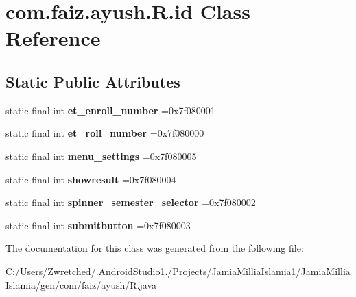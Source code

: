\hypertarget{classcom_1_1faiz_1_1ayush_1_1_r_1_1id}{}\section{com.\+faiz.\+ayush.\+R.\+id Class Reference}
\label{classcom_1_1faiz_1_1ayush_1_1_r_1_1id}
\subsection*{Static Public Attributes}
\begin{DoxyCompactItemize}
\item 
\hypertarget{classcom_1_1faiz_1_1ayush_1_1_r_1_1id_a3d6dbcf6f993a3baf3fa2a7e6fdab76b}{}static final int {\bfseries et\+\_\+enroll\+\_\+number} =0x7f080001\label{classcom_1_1faiz_1_1ayush_1_1_r_1_1id_a3d6dbcf6f993a3baf3fa2a7e6fdab76b}

\item 
\hypertarget{classcom_1_1faiz_1_1ayush_1_1_r_1_1id_a00f9cc366dc6da555ff6f483c35a7c0a}{}static final int {\bfseries et\+\_\+roll\+\_\+number} =0x7f080000\label{classcom_1_1faiz_1_1ayush_1_1_r_1_1id_a00f9cc366dc6da555ff6f483c35a7c0a}

\item 
\hypertarget{classcom_1_1faiz_1_1ayush_1_1_r_1_1id_a9604692f0d9b57136b6b43924a11715f}{}static final int {\bfseries menu\+\_\+settings} =0x7f080005\label{classcom_1_1faiz_1_1ayush_1_1_r_1_1id_a9604692f0d9b57136b6b43924a11715f}

\item 
\hypertarget{classcom_1_1faiz_1_1ayush_1_1_r_1_1id_a9eee6afec593791e6411cbcc1135db0c}{}static final int {\bfseries showresult} =0x7f080004\label{classcom_1_1faiz_1_1ayush_1_1_r_1_1id_a9eee6afec593791e6411cbcc1135db0c}

\item 
\hypertarget{classcom_1_1faiz_1_1ayush_1_1_r_1_1id_a28fd38abe59e81aefbc5474616f71603}{}static final int {\bfseries spinner\+\_\+semester\+\_\+selector} =0x7f080002\label{classcom_1_1faiz_1_1ayush_1_1_r_1_1id_a28fd38abe59e81aefbc5474616f71603}

\item 
\hypertarget{classcom_1_1faiz_1_1ayush_1_1_r_1_1id_ab4eec7d04fcf2551b55bd74bf19de055}{}static final int {\bfseries submitbutton} =0x7f080003\label{classcom_1_1faiz_1_1ayush_1_1_r_1_1id_ab4eec7d04fcf2551b55bd74bf19de055}

\end{DoxyCompactItemize}


The documentation for this class was generated from the following file\+:\begin{DoxyCompactItemize}
\item 
C\+:/\+Users/\+Zwretched/.\+Android\+Studio1./\+Projects/\+Jamia\+Millia\+Islamia1/\+Jamia\+Millia\+Islamia/gen/com/faiz/ayush/R.\+java\end{DoxyCompactItemize}
